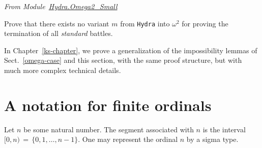 \vspace{4pt}
\noindent
\emph{From Module~\href{../theories/html/hydras.Hydra.Omega2_Small.html\#Impossible}{Hydra.Omega2\_Small}}


  


\begin{exercise}
Prove that there exists no variant $m$ from \texttt{Hydra} into $\omega^2$ for proving
    the  termination of all \emph{standard} battles.
\end{exercise}



\begin{remark}
In Chapter~\ref{ks-chapter}, we  prove a generalization of the impossibility lemmas of
Sect.~\ref{omega-case} and this section, with the same proof structure, but with much more 
complex technical details.
 \end{remark}





  


\section{A notation for finite ordinals}


Let $n$ be some natural number. The segment associated with $n$ is the interval 
$[0,n)\,=\,\{0,1,\dots,n-1\}$. 
One may represent the ordinal $n$ by a sigma type.


